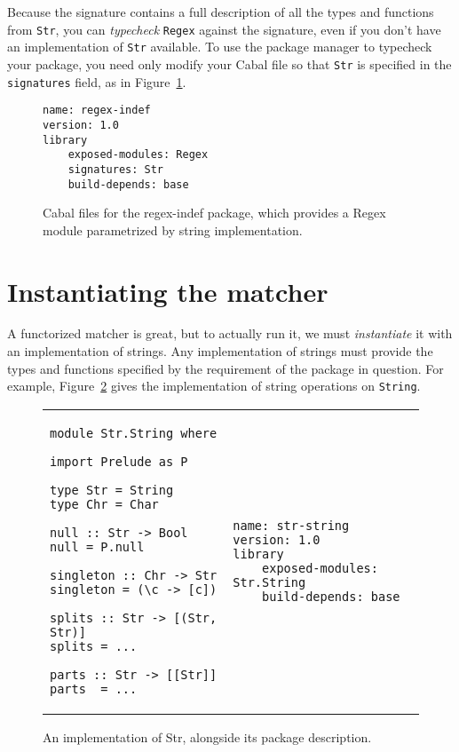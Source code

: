 Because the signature contains a full description of all the types
and functions from \verb|Str|, you can \emph{typecheck} \verb|Regex|
against the signature, even if you don't have an implementation of
\verb|Str| available.  To use the package manager to typecheck
your package, you need only modify your Cabal file so that
\verb|Str| is specified in the \verb|signatures| field, as in
Figure~\ref{fig:matcher-regex-indef-cabal}.

\begin{figure}
\begin{lstlisting}[language=Cabal]
name: regex-indef
version: 1.0
library
    exposed-modules: Regex
    signatures: Str
    build-depends: base
\end{lstlisting}
\caption{Cabal files for the regex-indef package, which provides a Regex
module parametrized by string implementation.}
\label{fig:matcher-regex-indef-cabal}
\end{figure}

\section{Instantiating the matcher}
\label{sec:instantiating-the-matcher}

A functorized matcher is great, but to actually run it, we must
\emph{instantiate} it with an implementation of strings.  Any implementation
of strings must provide the types and functions specified by the requirement
of the package in question. For example, Figure~\ref{fig:matcher-str-string-source}
gives the implementation of string operations on \verb|String|.

\begin{figure}
\begin{tabular}{p{} p{}}
\begin{lstlisting}
module Str.String where

import Prelude as P

type Str = String
type Chr = Char

null :: Str -> Bool
null = P.null

singleton :: Chr -> Str
singleton = (\c -> [c])

splits :: Str -> [(Str, Str)]
splits = ...

parts :: Str -> [[Str]]
parts  = ...
\end{lstlisting}
&
\begin{lstlisting}[language=Cabal]
name: str-string
version: 1.0
library
    exposed-modules: Str.String
    build-depends: base
\end{lstlisting}
\end{tabular}
\caption{An implementation of Str, alongside its package description.}
\label{fig:matcher-str-string-source}
\end{figure}

